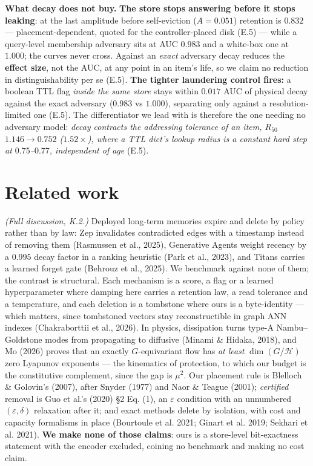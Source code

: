 \documentclass{article}
\begin{document}
\textbf{What decay does not buy.} \textbf{The store stops answering before it stops leaking}: at the last amplitude before self-eviction ($A=0.051$) retention is $0.832$ --- placement-dependent, quoted for the controller-placed disk (E.5) --- while a query-level membership adversary sits at AUC $0.983$ and a white-box one at $1.000$; the curves never cross. Against an \emph{exact} adversary decay reduces the \textbf{effect size}, not the AUC, at any point in an item's life, so we claim no reduction in distinguishability per se (E.5). \textbf{The tighter laundering control fires:} a boolean TTL flag \emph{inside the same store} stays within $0.017$ AUC of physical decay against the exact adversary ($0.983$ vs $1.000$), separating only against a resolution-limited one (E.5). The differentiator we lead with is therefore the one needing no adversary model: \emph{decay contracts the addressing tolerance of an item, $R_{50}$ $1.146\to0.752$ ($1.52\times$), where a TTL dict's lookup radius is a constant hard step at $0.75$--$0.77$, independent of age} (E.5).

\section{Related work}

\emph{(Full discussion, K.2.)} Deployed long-term memories expire and delete by policy rather than by law: Zep invalidates contradicted edges with a timestamp instead of removing them (Rasmussen et al., 2025), Generative Agents weight recency by a $0.995$ decay factor in a ranking heuristic (Park et al., 2023), and Titans carries a learned forget gate (Behrouz et al., 2025). We benchmark against none of them; the contrast is structural. Each mechanism is a score, a flag or a learned hyperparameter where damping here carries a retention law, a read tolerance and a temperature, and each deletion is a tombstone where ours is a byte-identity --- which matters, since tombstoned vectors stay reconstructible in graph ANN indexes (Chakraborttii et al., 2026). In physics, dissipation turns type-A Nambu--Goldstone modes from propagating to diffusive (Minami \& Hidaka, 2018), and Mo (2026) proves that an exactly $G$-equivariant flow has \emph{at least} $\dim(G/\mathcal H)$ zero Lyapunov exponents --- the kinematics of protection, to which our budget is the constitutive complement, since the gap is $\mu^2$. Our placement rule is Blelloch \& Golovin's (2007), after Snyder (1977) and Naor \& Teague (2001); \emph{certified} removal is Guo et al.'s (2020) \S 2 Eq. (1), an $\varepsilon$ condition with an unnumbered $(\varepsilon,\delta)$ relaxation after it; and exact methods delete by isolation, with cost and capacity formalisms in place (Bourtoule et al. 2021; Ginart et al. 2019; Sekhari et al. 2021). \textbf{We make none of those claims}: ours is a store-level bit-exactness statement with the encoder excluded, coining no benchmark and making no cost claim.
\end{document}
